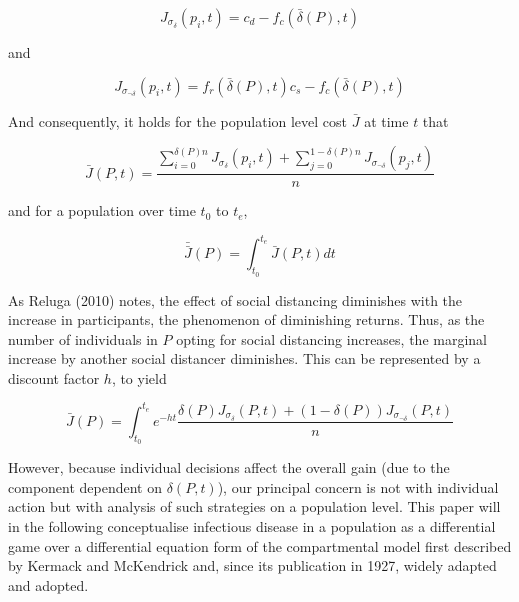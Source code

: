 \documentclass{article}
\begin{document}
\begin{equation}
	J_{\sigma_{\delta}}(p_i, t) = c_d - f_c(\bar{\delta}(P), t)
\end{equation}

\noindent and

\begin{equation}
	J_{\sigma_{\lnot \delta}}(p_i, t) = f_r(\bar{\delta}(P), t) c_s - f_c(\bar{\delta}(P), t)
\end{equation}

\noindent And consequently, it holds for the population level cost $\bar{J}$ at time $t$ that

\begin{equation}
	\bar{J}(P, t) = \frac{\displaystyle \sum_{i=0}^{\delta(P) n} J_{\sigma_{\delta}}(p_i, t) + \displaystyle \sum_{j=0}^{1-\delta(P) n} J_{\sigma_{\lnot \delta}}(p_j, t)}{n}
	\label{eq:cost_eqn}
\end{equation}

\noindent and for a population over time $t_0$ to $t_e$, 

\begin{equation}
	\bar{\bar{J}}(P) = \int_{t_0}^{t_e} \bar{J}(P, t) dt
\end{equation}

As Reluga (2010) notes, the effect of social distancing diminishes with the increase in participants, the phenomenon of diminishing returns.\cite{reluga2010game} Thus, as the number of individuals in $P$ opting for social distancing increases, the marginal increase by another social distancer diminishes. This can be represented by a discount factor $h$, to yield

\begin{equation}
	\bar{J}(P) = \int_{t_0}^{t_e} e^{-ht} \frac{\delta(P) J_{\sigma_{\delta}}(P, t) + (1 - \delta(P)) J_{\sigma_{\lnot \delta}}(P, t)}{n}
\end{equation}

However, because individual decisions affect the overall gain (due to the component dependent on $\delta(P, t)$), our principal concern is not with individual action but with analysis of such strategies on a population level. This paper will in the following conceptualise infectious disease in a population as a differential game over a differential equation form of the compartmental model first described by Kermack and McKendrick\cite{kermack1927contribution} and, since its publication in 1927, widely adapted and adopted.\cite{vstvepan2007kermack,roberts1999kermack,capasso1978generalization}
\end{document}
